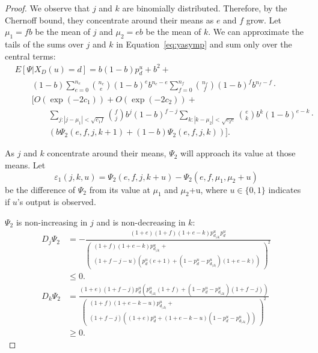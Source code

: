 \documentclass[prodmode,acmtissec]{acmsmall}
\begin{document}
\begin{proof}
We observe that $j$ and $k$ are binomially distributed.  Therefore, by the Chernoff bound, they concentrate around their means as $e$ and $f$ grow.  Let $\mu_1 = fb$ be the mean of $j$ and $\mu_2 = eb$  be the mean of $k$.  We can approximate the tails of the sums over $j$ and $k$ in Equation~\ref{eq:yasymp} and sum only over the central terms:
\begin{equation} \label{eq:yasymp2}
\begin{split}
  &E[\Psi | X_D(u)=d] = b(1-b)p^u_d + b^2 +\\
  &\qquad (1-b) \sum_{e=0}^{n_e} \binom{n_e}{e} (1-b)^e b^{n_e-e} \sum_{f=0}^{n_f} \binom{n_f}{f} (1-b)^f b^{n_f-f} \cdot\\
  &\qquad \bigg[ O\left(\exp(-2 c_1)\right) + O\left( \exp(-2 c_2)\right) +\\
  &\qquad \qquad \sum_{j: |j-\mu_1| < \sqrt{c_1 f}} \binom{f}{j} b^j (1-b)^{f-j} \sum_{k: |k-\mu_2|<\sqrt{c_2 e}} \binom{e}{k} b^k (1-b)^{e-k}\cdot\\
  &\qquad \qquad\left( b \Psi_2(e,f,j,k+1) + (1-b)\Psi_2(e,f,j,k) \right) \bigg].  
\end{split}
\end{equation}

As $j$ and $k$ concentrate around their means, $\Psi_2$ will approach its value at those means.  Let
\begin{equation*}
\varepsilon_1(j,k,u) = \Psi_2(e,f,j,k+u) - \Psi_2(e,f,\mu_1,\mu_2+u)
\end{equation*}
be the difference of $\Psi_2$ from its value at $\mu_1$ and $\mu_2$+u, where $u\in \{0,1\}$ indicates if $u$'s output is observed.

$\Psi_2$ is non-increasing in $j$ and is non-decreasing in $k$:
\begin{align*}
D_j \Psi_2 &= -\frac{(1+e) (1+f) (1+e-k) p^u_{d_{|\Delta|}} p^u_d}{\left( \begin{array}{l}(1+f) (1+e-k) p^u_{d_{|\Delta|}} + \\(1+f-j-u) (p^u_d (e+1) +(1-p^u_d-p^u_{d_{|\Delta|}})(1+e-k)) \end{array} \right)^2}\\
&\le 0.\\
D_k \Psi_2 &= \frac{(1+e) (1+f-j) p^u_d  (p^u_{d_{|\Delta|}}(1+f)+(1-p^u_d-p^u_{d_{|\Delta|}})(1+f-j))}{\left( \begin{array}{l} (1+f) (1+e-k-u)p^u_{d_{|\Delta|}} +\\ (1+f-j) ((1+e) p^u_d +(1+e-k-u) (1-p^u_d-p^u_{d_{|\Delta|}}) ) \end{array} \right)^2}\\
&\ge 0.
\end{align*}


\end{proof}
\end{document}
